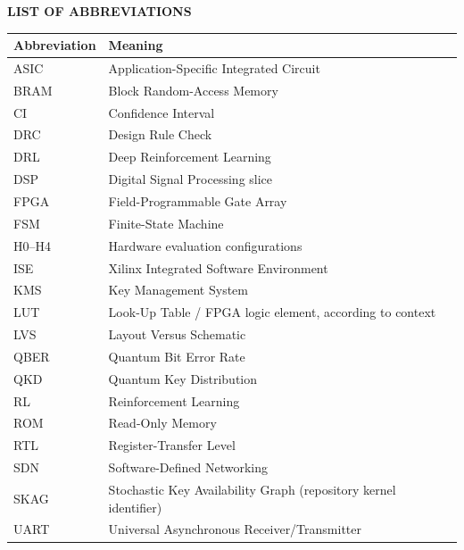 \begin{center}
  {\bfseries\fontsize{16pt}{19pt}\selectfont LIST OF ABBREVIATIONS}
\end{center}
\vspace{0.6cm}

\begin{longtable}{@{}p{}p{}@{}}
\toprule
\textbf{Abbreviation} & \textbf{Meaning}\\
\midrule
\endhead
ASIC & Application-Specific Integrated Circuit\\
BRAM & Block Random-Access Memory\\
CI & Confidence Interval\\
DRC & Design Rule Check\\
DRL & Deep Reinforcement Learning\\
DSP & Digital Signal Processing slice\\
FPGA & Field-Programmable Gate Array\\
FSM & Finite-State Machine\\
H0--H4 & Hardware evaluation configurations\\
ISE & Xilinx Integrated Software Environment\\
KMS & Key Management System\\
LUT & Look-Up Table / FPGA logic element, according to context\\
LVS & Layout Versus Schematic\\
QBER & Quantum Bit Error Rate\\
QKD & Quantum Key Distribution\\
RL & Reinforcement Learning\\
ROM & Read-Only Memory\\
RTL & Register-Transfer Level\\
SDN & Software-Defined Networking\\
SKAG & Stochastic Key Availability Graph (repository kernel identifier)\\
UART & Universal Asynchronous Receiver/Transmitter\\
\bottomrule
\end{longtable}
